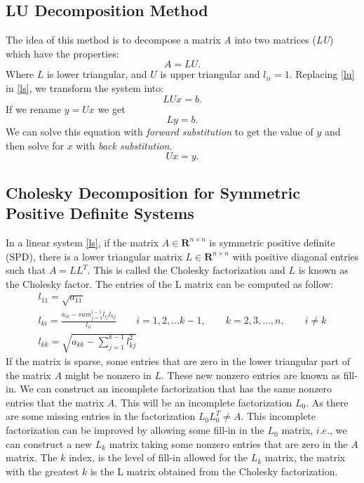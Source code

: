 \documentclass[a4paper,10pt]{report}
\begin{document}
\subsection{LU Decomposition Method}
The idea of this method is to decompose a matrix \emph{A} into two matrices (\emph{LU}) which have the properties:
\begin{equation}\label{lu}
 A=LU.
\end{equation}
Where $L$ is lower triangular, and $U$ is upper triangular and $l_{ii}=1$.
Replacing \eqref{lu} in \eqref{ls}, we transform the system into:
\begin{equation*}
 LUx=b.
\end{equation*}
If we rename $y=Ux$ we get
\begin{equation*}
 Ly=b.
\end{equation*}
We can solve this equation with \emph{forward substitution} to get the value of $y$ and then solve for $x$ with \emph{back substitution}.
\begin{equation*}
 Ux=y.
\end{equation*}


\subsection{Cholesky Decomposition for Symmetric Positive Definite Systems}
In a linear system \eqref{ls}, if the matrix $ A \in \mathbf{R} ^{n\times n} $ is symmetric positive definite (SPD), there is a lower triangular matrix
$ L\in\mathbf{R}^{n\times n} $ with positive diagonal entries such that $ A=L{L}^{T} $. This is called the Cholesky factorization and $L$ is known as
the Cholesky factor.
The entries of the L matrix can be computed as follow:
\begin{gather*}
l_{11}=\sqrt{a_{11}}\\
l_{ki}=\frac{a_{ik}-sum_{j=1}^{i-1}l_{ij}l_{kj}}{l_{ii}}\qquad i=1,2,...k-1, \qquad k=2,3,...,n,\qquad i \neq k\\
l_{kk}=\sqrt{a_{kk}-\sum_{j=1}^{k-1}l_{kj}^2}
\end{gather*}
If the matrix is sparse, some entries that are zero in the lower triangular part of the matrix $A$ might be nonzero in $L$. These new nonzero entries are known as fill-in.
We can construct an incomplete factorization that has the same nonzero entries that the matrix $A$. This will be an incomplete factorization $L_0$. As there are
some missing entries in the factorization $L_0L_0^T\neq A$.
This incomplete factorization can be improved by allowing some fill-in in the $L_0$ matrix, $i.e.$, we can construct a new $L_k$ matrix taking some nonzero entries that are zero in the $A$ matrix.
The $k$ index, is the level of fill-in allowed for the $L_k$ matrix, the matrix with the greatest $k$ is the L matrix obtained from the Cholesky factorization.
\end{document}
